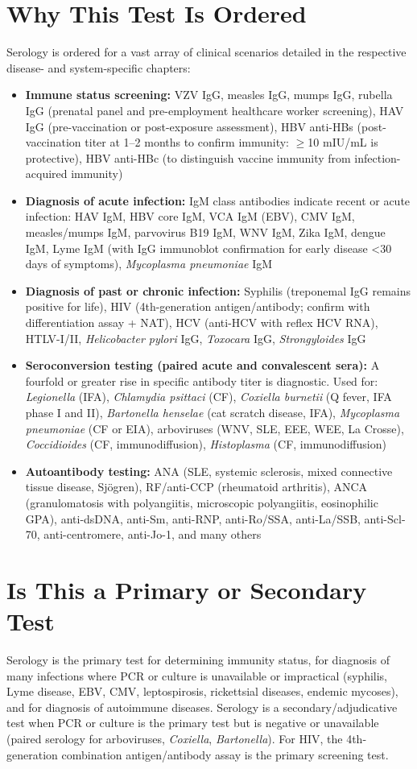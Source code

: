\section*{Why This Test Is Ordered}
Serology is ordered for a vast array of clinical scenarios detailed in the respective disease- and system-specific chapters:
\begin{itemize}
  \item \textbf{Immune status screening:} VZV IgG, measles IgG, mumps IgG, rubella IgG (prenatal panel and pre-employment healthcare worker screening), HAV IgG (pre-vaccination or post-exposure assessment), HBV anti-HBs (post-vaccination titer at 1--2 months to confirm immunity: $\geq$10 mIU/mL is protective), HBV anti-HBc (to distinguish vaccine immunity from infection-acquired immunity)
  \item \textbf{Diagnosis of acute infection:} IgM class antibodies indicate recent or acute infection: HAV IgM, HBV core IgM, VCA IgM (EBV), CMV IgM, measles/mumps IgM, parvovirus B19 IgM, WNV IgM, Zika IgM, dengue IgM, Lyme IgM (with IgG immunoblot confirmation for early disease <30 days of symptoms), \textit{Mycoplasma pneumoniae} IgM
  \item \textbf{Diagnosis of past or chronic infection:} Syphilis (treponemal IgG remains positive for life), HIV (4th-generation antigen/antibody; confirm with differentiation assay + NAT), HCV (anti-HCV with reflex HCV RNA), HTLV-I/II, \textit{Helicobacter pylori} IgG, \textit{Toxocara} IgG, \textit{Strongyloides} IgG
  \item \textbf{Seroconversion testing (paired acute and convalescent sera):} A fourfold or greater rise in specific antibody titer is diagnostic. Used for: \textit{Legionella} (IFA), \textit{Chlamydia psittaci} (CF), \textit{Coxiella burnetii} (Q fever, IFA phase I and II), \textit{Bartonella henselae} (cat scratch disease, IFA), \textit{Mycoplasma pneumoniae} (CF or EIA), arboviruses (WNV, SLE, EEE, WEE, La Crosse), \textit{Coccidioides} (CF, immunodiffusion), \textit{Histoplasma} (CF, immunodiffusion)
  \item \textbf{Autoantibody testing:} ANA (SLE, systemic sclerosis, mixed connective tissue disease, Sjögren), RF/anti-CCP (rheumatoid arthritis), ANCA (granulomatosis with polyangiitis, microscopic polyangiitis, eosinophilic GPA), anti-dsDNA, anti-Sm, anti-RNP, anti-Ro/SSA, anti-La/SSB, anti-Scl-70, anti-centromere, anti-Jo-1, and many others
\end{itemize}

\section*{Is This a Primary or Secondary Test}
Serology is the primary test for determining immunity status, for diagnosis of many infections where PCR or culture is unavailable or impractical (syphilis, Lyme disease, EBV, CMV, leptospirosis, rickettsial diseases, endemic mycoses), and for diagnosis of autoimmune diseases. Serology is a secondary/adjudicative test when PCR or culture is the primary test but is negative or unavailable (paired serology for arboviruses, \textit{Coxiella}, \textit{Bartonella}). For HIV, the 4th-generation combination antigen/antibody assay is the primary screening test.


